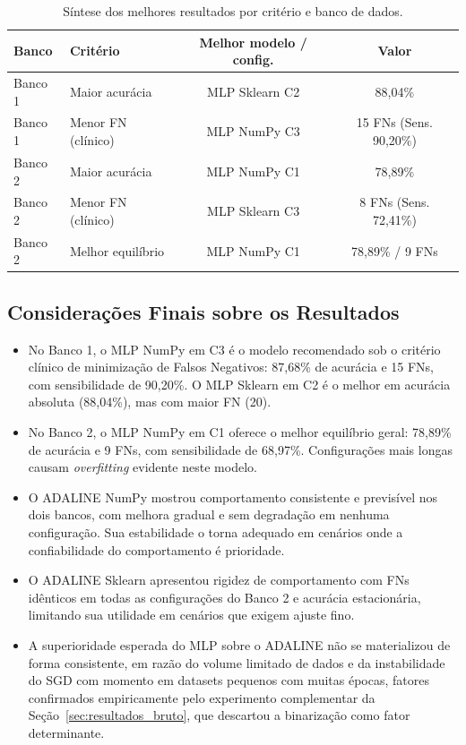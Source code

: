 \begin{table}[H]
\centering
\caption{Síntese dos melhores resultados por critério e banco de dados.}
\label{tab:resumo_geral}
\begin{tabular}{|l|l|c|c|}
\hline
\textbf{Banco} & \textbf{Critério} & \textbf{Melhor modelo / config.} & \textbf{Valor} \\
\hline
Banco 1 & Maior acurácia         & MLP Sklearn C2        & 88,04\% \\
Banco 1 & Menor FN (clínico)     & MLP NumPy C3          & 15 FNs (Sens. 90,20\%) \\
Banco 2 & Maior acurácia         & MLP NumPy C1          & 78,89\% \\
Banco 2 & Menor FN (clínico)     & MLP Sklearn C3        & 8 FNs (Sens. 72,41\%) \\
Banco 2 & Melhor equilíbrio      & MLP NumPy C1          & 78,89\% / 9 FNs \\
\hline
\end{tabular}
\end{table}

\subsection{Considerações Finais sobre os Resultados}
\label{sec:consideracoes_resultados}

\begin{itemize}
    \item No Banco 1, o MLP NumPy em C3 é o modelo recomendado sob o critério clínico de minimização de Falsos Negativos: 87,68\% de acurácia e 15 FNs, com sensibilidade de 90,20\%. O MLP Sklearn em C2 é o melhor em acurácia absoluta (88,04\%), mas com maior FN (20).

    \item No Banco 2, o MLP NumPy em C1 oferece o melhor equilíbrio geral: 78,89\% de acurácia e 9 FNs, com sensibilidade de 68,97\%. Configurações mais longas causam \textit{overfitting} evidente neste modelo.

    \item O ADALINE NumPy mostrou comportamento consistente e previsível nos dois bancos, com melhora gradual e sem degradação em nenhuma configuração. Sua estabilidade o torna adequado em cenários onde a confiabilidade do comportamento é prioridade.

    \item O ADALINE Sklearn apresentou rigidez de comportamento com FNs idênticos em todas as configurações do Banco 2 e acurácia estacionária, limitando sua utilidade em cenários que exigem ajuste fino.

    \item A superioridade esperada do MLP sobre o ADALINE não se materializou de forma consistente, em razão do volume limitado de dados e da instabilidade do SGD com momento em datasets pequenos com muitas épocas, fatores confirmados empiricamente pelo experimento complementar da Seção~\ref{sec:resultados_bruto}, que descartou a binarização como fator determinante.
\end{itemize}

